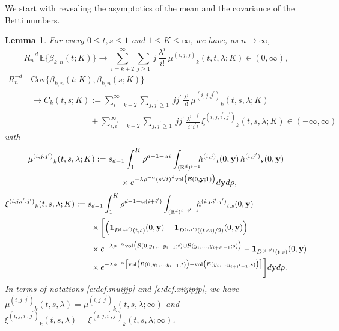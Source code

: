 \documentclass[11pt]{amsart}
\numberwithin{equation}{section}
\theoremstyle{plain}
\newtheorem{lemma}[theorem]{Lemma}
\theoremstyle{definition}
\begin{document}
We start with revealing the asymptotics of the mean and the covariance of the Betti numbers.
\begin{lemma}  \label{l:giant.cov}
For every $0 \leq  t, s \leq 1$ and $1\leq K\leq \infty$, we have, as $n\to \infty$,
$$
R_n^{-d}\, {\mathbb{E}} \bigl\{ \beta_{k,n}(t; K) \bigr\} \to \sum_{i=k+2}^\infty \sum_{j\geq1}\, j\, \frac{\lambda^i}{i!}\, {\mu^{(i,j,j)}}_k (t,t,\lambda; K) \in (0,\infty),
$$
\begin{align*}
R_n^{-d}\, &\text{Cov} \bigl\{ \beta_{k,n}(t; K), \beta_{k,n}(s; K) \bigr\} \\
&\to C_k (t,s; K) := \sum_{i=k+2}^\infty \sum_{j, {j^{\prime}} \geq 1}\, j {j^{\prime}}\, \frac{\lambda^i}{i!}\, {\mu^{(i,j,{j^{\prime}})}}_k (t,s,\lambda; K)  \\
&\qquad \qquad \qquad \quad +\sum_{i, {i^{\prime}} = k+2}^\infty \sum_{j, {j^{\prime}} \geq1} \, j {j^{\prime}}\, \frac{\lambda^{i + {i^{\prime}}}}{i! \, {i^{\prime}}!} \, {\xi^{(i,j,{i^{\prime}},{j^{\prime}})}}_k(t,s,\lambda; K) \in (-\infty,\infty)
\end{align*}
with
\begin{align}
{\mu^{(i,j,{j^{\prime}})}}_k (t,s,\lambda; K) &:= s_{d-1} \int_1^K \rho^{d-1-\alpha i} \int_{({{\mathbb R}}^d)^{i-1}} \hspace{-5pt} {h^{(i,j)}}_t(0,{{\bf y}})\, {h^{(i,{j^{\prime}})}}_s(0,{{\bf y}})  \label{e:def.muijjp1} \\
& \qquad \quad \times e^{-\lambda \rho^{-\alpha} (s \vee t)^d \text{vol} \bigl( {\mathcal B} (0,{{\bf y}}; 1) \bigr)} d{{\bf y}} d\rho, \notag
\end{align}
\begin{align*}
{\xi^{(i,j,{i^{\prime}},{j^{\prime}})}}_k(t,s,\lambda; K) &:= s_{d-1} \int_1^K \rho^{d-1-\alpha (i+{i^{\prime}})} \int_{({{\mathbb R}}^d)^{i+{i^{\prime}}-1}} \hspace{-5pt} {h^{(i, j, i^{\prime}, j^{\prime})}}_{t,s}(0,{{\bf y}}) \label{e:def.xiijipjp1} \\
&  \qquad \times \biggl[ \Bigl( {{\bf 1}}_{{D^{(i,{i^{\prime}})}} (t,s)}(0,{{\bf y}}) - {{\bf 1}}_{{D^{(i,{i^{\prime}})}}( (t\vee s) /2)} (0,{{\bf y}}) \Bigr)\, \notag \\
&\qquad \times e^{-\lambda \rho^{-\alpha} \text{vol} \bigl( {\mathcal B}(0,y_1,\dots y_{i-1}; t) \cup {\mathcal B} (y_i, \dots, y_{i+{i^{\prime}}-1}; s) \bigr)}- {{\bf 1}}_{{D^{(i,{i^{\prime}})}} (t,s)}(0,{{\bf y}})  \notag \\
& \qquad  \times e^{-\lambda \rho^{-\alpha} \bigl[ \text{vol}\bigl({\mathcal B}(0,y_1,\dots y_{i-1}; t)\bigr) +  \text{vol}\bigl({\mathcal B}(y_i,\dots y_{i+{i^{\prime}}-1}; s)\bigr) \bigr]}   \biggr] d{{\bf y}} d\rho. \notag
\end{align*}
In terms of notations \eqref{e:def.muijjp} and \eqref{e:def.xiijipjp}, we have ${\mu^{(i,j,{j^{\prime}})}}_k(t,s,\lambda) = {\mu^{(i,j,{j^{\prime}})}}_k(t,s,\lambda; \infty)$ and ${\xi^{(i,j,{i^{\prime}},{j^{\prime}})}}_k(t,s,\lambda) = {\xi^{(i,j,{i^{\prime}},{j^{\prime}})}}_k(t,s,\lambda; \infty)$.
\end{lemma}
\end{document}
